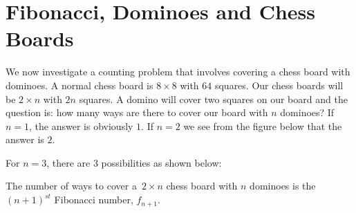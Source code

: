 \documentclass[handout]{ximera}
\begin{document}
\section{Fibonacci, Dominoes and Chess Boards}
We now investigate a counting problem that involves covering a chess board with dominoes. 
A normal chess board is $8 \times 8$ with $64$ squares.  
Our chess boards will be $2 \times n$ with $2n$ squares.  
A domino will cover two squares on our board and the question is: how many ways are there to cover our board with $n$ dominoes?
If $n=1$, the answer is obviously $1$.  If $n=2$ we see from the figure below that the answer is $2$.

\begin{image}
\end{image}

For $n=3$, there are 3 possibilities as shown below:


\begin{image}
\end{image}

\begin{proposition}
The number of ways to cover a $\, 2 \times n$ chess board with $n$ dominoes is the $(n+1)^{st}$ Fibonacci number, $f_{n+1}$.
\end{proposition}
\end{document}
